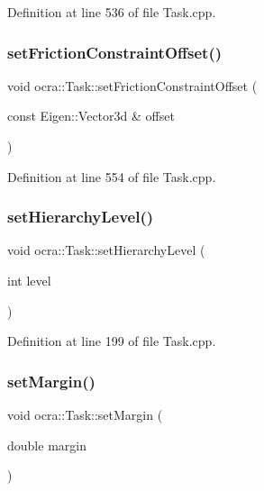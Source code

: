 Definition at line 536 of file Task.\+cpp.

\hypertarget{classocra_1_1Task_ac3738872a446ffc6361d096659ae2ba6}{}\label{classocra_1_1Task_ac3738872a446ffc6361d096659ae2ba6} 
\subsubsection{\texorpdfstring{set\+Friction\+Constraint\+Offset()}{setFrictionConstraintOffset()}}
{\footnotesize\ttfamily void ocra\+::\+Task\+::set\+Friction\+Constraint\+Offset (\begin{DoxyParamCaption}\item[{const Eigen\+::\+Vector3d \&}]{offset }\end{DoxyParamCaption})}



Definition at line 554 of file Task.\+cpp.

\hypertarget{classocra_1_1Task_a07617befcfa5bf8f0711d47965ed8337}{}\label{classocra_1_1Task_a07617befcfa5bf8f0711d47965ed8337} 
\subsubsection{\texorpdfstring{set\+Hierarchy\+Level()}{setHierarchyLevel()}}
{\footnotesize\ttfamily void ocra\+::\+Task\+::set\+Hierarchy\+Level (\begin{DoxyParamCaption}\item[{int}]{level }\end{DoxyParamCaption})}



Definition at line 199 of file Task.\+cpp.

\hypertarget{classocra_1_1Task_a62b7814143aa571cc668fef9bdea6815}{}\label{classocra_1_1Task_a62b7814143aa571cc668fef9bdea6815} 
\subsubsection{\texorpdfstring{set\+Margin()}{setMargin()}}
{\footnotesize\ttfamily void ocra\+::\+Task\+::set\+Margin (\begin{DoxyParamCaption}\item[{double}]{margin }\end{DoxyParamCaption})}



